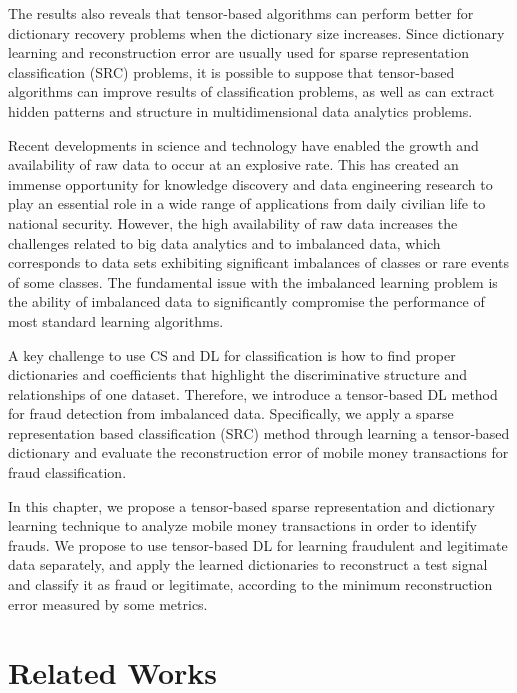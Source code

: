 The results also reveals that tensor-based algorithms can perform better for dictionary recovery problems when the dictionary size increases. Since dictionary learning and reconstruction error are usually used for sparse representation classification (SRC) problems, it is possible to suppose that tensor-based algorithms can improve results of classification problems, as well as can extract hidden patterns and structure in multidimensional data analytics problems.

Recent developments in science and technology have enabled the growth and availability of raw data to occur at an explosive rate. This has created an immense opportunity for knowledge discovery and data engineering research to play an essential role in a wide range of applications from daily civilian life to national security. However, the high availability of raw data increases the challenges related to big data analytics and to imbalanced data, which corresponds to data sets exhibiting significant imbalances of classes or rare events of some classes. The fundamental issue with the imbalanced learning problem is the ability of imbalanced data to significantly compromise the performance of most standard learning algorithms.

A key challenge to use CS and DL for classification is how to find proper dictionaries and coefficients that highlight the discriminative structure and relationships of one dataset. Therefore, we introduce a tensor-based DL method for fraud detection from imbalanced data. Specifically, we apply a sparse representation based classification (SRC) method through learning a tensor-based dictionary and evaluate the reconstruction error of mobile money transactions for fraud classification. 

In this chapter, we propose a tensor-based sparse representation and dictionary learning technique to analyze mobile money transactions in order to identify frauds. We propose to use tensor-based DL for learning fraudulent and legitimate data separately, and apply the learned dictionaries to reconstruct a test signal and classify it as fraud or legitimate, according to the minimum reconstruction error measured by some metrics.


\section{Related Works}
\label{sec:4_relatedworks}


